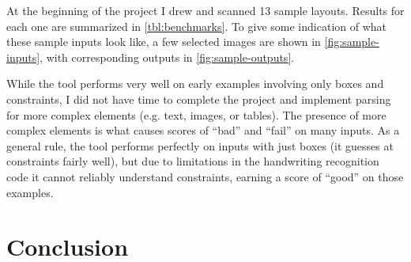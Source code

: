 \documentclass{article}
\begin{document}
At the beginning of the project I drew and scanned 13 sample layouts. Results
for each one are summarized in \autoref{tbl:benchmarks}. To give some indication
of what these sample inputs look like, a few selected images are shown in
\autoref{fig:sample-inputs}, with corresponding outputs in
\autoref{fig:sample-outputs}.

While the tool performs very well on early examples involving only boxes and
constraints, I did not have time to complete the project and implement parsing
for more complex elements (e.g. text, images, or tables). The presence of more
complex elements is what causes scores of ``bad'' and ``fail'' on many inputs.
As a general rule, the tool performs perfectly on inputs with just boxes (it
guesses at constraints fairly well), but due to limitations in the handwriting
recognition code it cannot reliably understand constraints, earning a score of
``good'' on those examples.

\section{Conclusion}

{}

\end{document}
